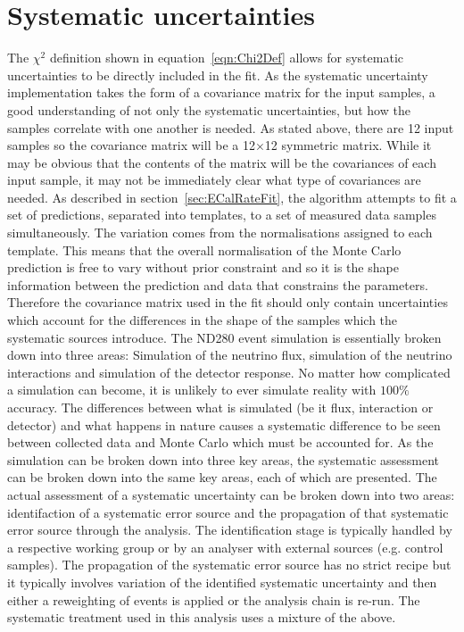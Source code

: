 \section{Systematic uncertainties}
\label{sec:SystematicUncertainties}
The $\chi^2$ definition shown in equation~\ref{eqn:Chi2Def} allows for systematic uncertainties to be directly included in the fit.  As the systematic uncertainty implementation takes the form of a covariance matrix for the input samples, a good understanding of not only the systematic uncertainties, but how the samples correlate with one another is needed.  
\newline
\newline
As stated above, there are 12 input samples so the covariance matrix will be a 12$\times$12 symmetric matrix.  While it may be obvious that the contents of the matrix will be the covariances of each input sample, it may not be immediately clear what type of covariances are needed.  As described in section~\ref{sec:ECalRateFit}, the algorithm attempts to fit a set of predictions, separated into templates, to a set of measured data samples simultaneously.  The variation comes from the normalisations assigned to each template.  This means that the overall normalisation of the Monte Carlo prediction is free to vary without prior constraint and so it is the shape information between the prediction and data that constrains the parameters.  Therefore the covariance matrix used in the fit should only contain uncertainties which account for the differences in the shape of the samples which the systematic sources introduce.
\newline
\newline
The ND280 event simulation is essentially broken down into three areas: Simulation of the neutrino flux, simulation of the neutrino interactions and simulation of the detector response.  No matter how complicated a simulation can become, it is unlikely to ever simulate reality with $100\%$ accuracy.  The differences between what is simulated (be it flux, interaction or detector) and what happens in nature causes a systematic difference to be seen between collected data and Monte Carlo which must be accounted for.  As the simulation can be broken down into three key areas, the systematic assessment can be broken down into the same key areas, each of which are presented.  The actual assessment of a systematic uncertainty can be broken down into two areas: identifaction of a systematic error source and the propagation of that systematic error source through the analysis.  The identification stage is typically handled by a respective working group or by an analyser with external sources (e.g. control samples).  The propagation of the systematic error source has no strict recipe but it typically involves variation of the identified systematic uncertainty and then either a reweighting of events is applied or the analysis chain is re-run.  The systematic treatment used in this analysis uses a mixture of the above.
